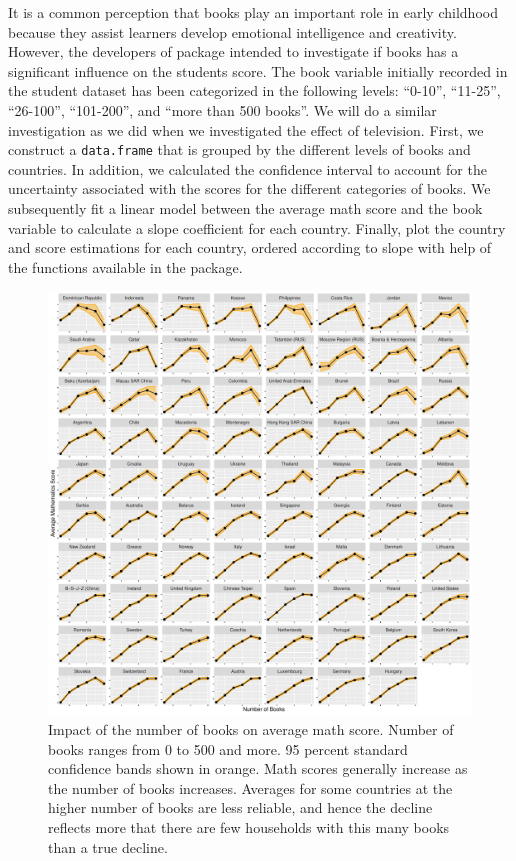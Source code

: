 It is a common perception that books play an important role in early
childhood because they assist learners develop emotional intelligence
and creativity. However, the developers of 
package intended to investigate if books has a significant influence on
the students score. The book variable initially recorded in the student
dataset has been categorized in the following levels: ``0-10'',
``11-25'', ``26-100'', ``101-200'', and ``more than 500 books''. We will
do a similar investigation as we did when we investigated the effect of
television. First, we construct a \texttt{data.frame} that is grouped by
the different levels of books and countries. In addition, we calculated
the confidence interval to account for the uncertainty associated with
the scores for the different categories of books. We subsequently fit a
linear model between the average math score and the book variable to
calculate a slope coefficient for each country. Finally, plot the
country and score estimations for each country, ordered according to
slope with help of the functions available in the 
\citep{ggplot2} package.

\begin{Schunk}
\begin{figure}[H]
\includegraphics[width=1\linewidth]{learningtower_files/figure-latex/book-plot-1} \caption[Impact of the number of books on average math score]{Impact of the number of books on average math score. Number of books ranges from 0 to 500 and more. 95 percent standard confidence bands shown in orange. Math scores generally increase as the number of books increases. Averages for some countries at the higher number of books are less reliable, and hence the decline reflects more that there are few households with this many books than a true decline.}\label{fig:book-plot}
\end{figure}
\end{Schunk}

